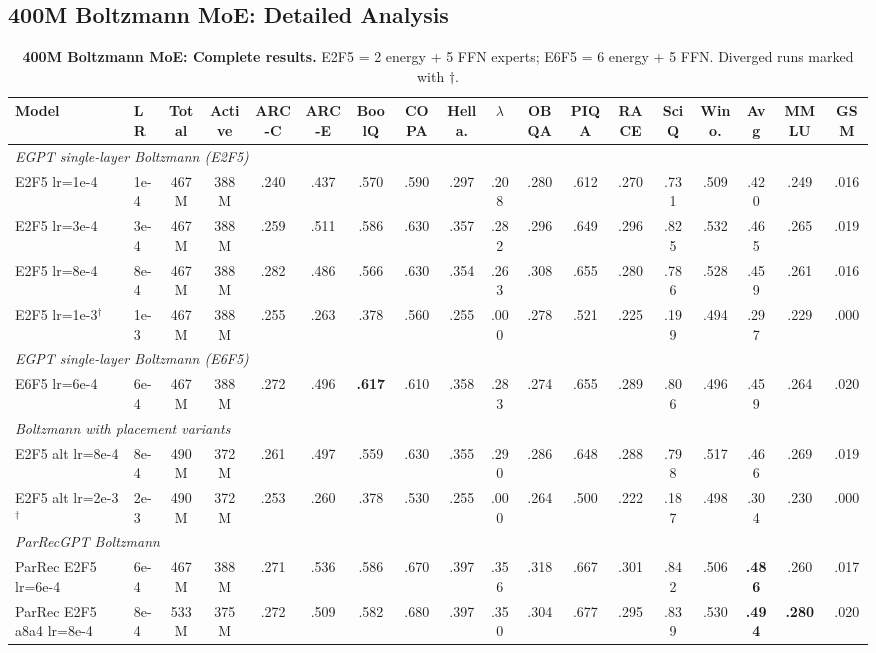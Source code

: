 \documentclass[oneside]{article}
\begin{document}
\subsection{400M Boltzmann MoE: Detailed Analysis}
\label{sec:moe_boltz}

\begin{table}[t]
\centering
\caption{\textbf{400M Boltzmann MoE: Complete results.} E2F5 = 2 energy + 5 FFN experts; E6F5 = 6 energy + 5 FFN. Diverged runs marked with $\dagger$.}
\label{tab:moe_400m_boltz}
\begin{adjustbox}{max width=\textwidth}
\begin{tabular}{l|l|cc|ccccccccccc|c|cc}
\toprule
\textbf{Model} & \textbf{LR} & \textbf{Total} & \textbf{Active} & \textbf{ARC-C} & \textbf{ARC-E} & \textbf{BoolQ} & \textbf{COPA} & \textbf{Hella.} & \textbf{$\lambda$} & \textbf{OBQA} & \textbf{PIQA} & \textbf{RACE} & \textbf{SciQ} & \textbf{Wino.} & \textbf{Avg} & \textbf{MMLU} & \textbf{GSM} \\
\midrule
\multicolumn{18}{l}{\textit{EGPT single-layer Boltzmann (E2F5)}} \\
E2F5 lr=1e-4          & 1e-4 & 467M & 388M & .240 & .437 & .570 & .590 & .297 & .208 & .280 & .612 & .270 & .731 & .509 & .420 & .249 & .016 \\
E2F5 lr=3e-4          & 3e-4 & 467M & 388M & .259 & .511 & .586 & .630 & .357 & .282 & .296 & .649 & .296 & .825 & .532 & .465 & .265 & .019 \\
E2F5 lr=8e-4          & 8e-4 & 467M & 388M & .282 & .486 & .566 & .630 & .354 & .263 & .308 & .655 & .280 & .786 & .528 & .459 & .261 & .016 \\
E2F5 lr=1e-3$^\dagger$ & 1e-3 & 467M & 388M & .255 & .263 & .378 & .560 & .255 & .000 & .278 & .521 & .225 & .199 & .494 & .297 & .229 & .000 \\
\midrule
\multicolumn{18}{l}{\textit{EGPT single-layer Boltzmann (E6F5)}} \\
E6F5 lr=6e-4          & 6e-4 & 467M & 388M & .272 & .496 & \textbf{.617} & .610 & .358 & .283 & .274 & .655 & .289 & .806 & .496 & .459 & .264 & .020 \\
\midrule
\multicolumn{18}{l}{\textit{Boltzmann with placement variants}} \\
E2F5 alt lr=8e-4      & 8e-4 & 490M & 372M & .261 & .497 & .559 & .630 & .355 & .290 & .286 & .648 & .288 & .798 & .517 & .466 & .269 & .019 \\
E2F5 alt lr=2e-3$^\dagger$ & 2e-3 & 490M & 372M & .253 & .260 & .378 & .530 & .255 & .000 & .264 & .500 & .222 & .187 & .498 & .304 & .230 & .000 \\
\midrule
\multicolumn{18}{l}{\textit{ParRecGPT Boltzmann}} \\
ParRec E2F5 lr=6e-4   & 6e-4 & 467M & 388M & .271 & .536 & .586 & .670 & .397 & .356 & .318 & .667 & .301 & .842 & .506 & \textbf{.486} & .260 & .017 \\
ParRec E2F5 a8a4 lr=8e-4 & 8e-4 & 533M & 375M & .272 & .509 & .582 & .680 & .397 & .350 & .304 & .677 & .295 & .839 & .530 & \textbf{.494} & \textbf{.280} & .020 \\
\bottomrule
\end{tabular}
\end{adjustbox}
\end{table}
\end{document}
